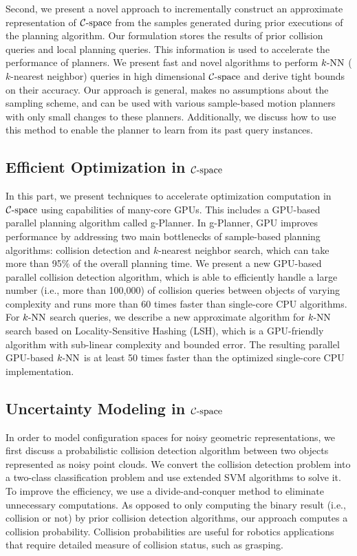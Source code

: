 Second, we present a novel approach to incrementally construct an approximate representation of $\mathcal C\text{-space}$ from the samples generated during prior executions of the planning algorithm. Our formulation stores the results of prior collision queries and local planning queries. This information is used to accelerate the performance of planners. We present fast and novel algorithms to perform $k\text{-NN}$ ($k$-nearest neighbor) queries in high dimensional $\mathcal C\text{-space}$ and derive tight bounds on their accuracy. Our approach is general, makes no assumptions about the sampling scheme, and can be used with various sample-based motion planners with only small changes to these planners. Additionally, we discuss how to use this method to enable the planner to learn from its past query instances.

\subsection{Efficient Optimization in $\mathcal C\text{-space}$}
In this part, we present techniques to accelerate optimization computation in $\mathcal C\text{-space}$ using capabilities of many-core GPUs. This includes a GPU-based parallel planning algorithm called g-Planner. In g-Planner, GPU improves performance by addressing two main bottlenecks of sample-based planning algorithms: collision detection and $k$-nearest neighbor search, which can take more than 95\% of the overall planning time. We present a new GPU-based parallel collision detection
algorithm, which is able to efficiently handle a large number (i.e., more than 100,000) of collision queries between objects of varying complexity and runs more than 60 times faster than single-core CPU
algorithms. For $k\text{-NN}$ search queries, we describe a new approximate algorithm for $k\text{-NN}$ search based on Locality-Sensitive
Hashing (LSH), which is a GPU-friendly algorithm with sub-linear complexity and bounded error. The resulting
parallel GPU-based $k\text{-NN}$ is at least 50 times faster than the optimized single-core CPU implementation.

\subsection{Uncertainty Modeling in $\mathcal C\text{-space}$}
In order to model configuration spaces for noisy geometric representations, we first discuss a probabilistic collision detection algorithm between two objects represented as noisy point clouds. We convert the collision detection problem into a two-class classification problem and use extended SVM algorithms to solve it. To improve the efficiency, we use a divide-and-conquer method to eliminate unnecessary computations. As opposed to only computing the binary result (i.e., collision or not) by prior collision detection algorithms, our approach computes a collision probability. Collision probabilities are useful for robotics applications that require detailed measure of collision status, such as grasping.

